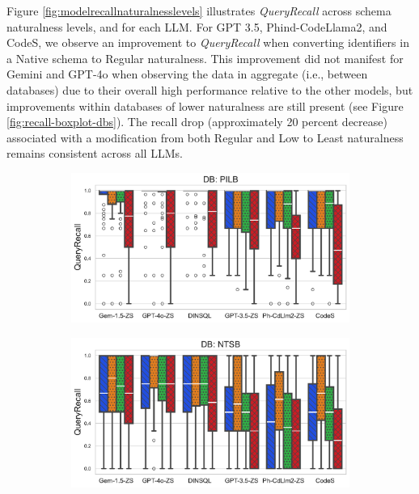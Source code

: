 Figure \ref{fig:modelrecallnaturalnesslevels} illustrates \emph{QueryRecall} across schema naturalness levels, and for each LLM.
For GPT 3.5, Phind-CodeLlama2, and CodeS, we observe an improvement to \emph{QueryRecall} when converting identifiers in a Native schema to Regular naturalness.
This improvement did not manifest for Gemini and GPT-4o when observing the data in aggregate (i.e., between databases) due to their overall high performance relative to the other models, but improvements within databases of lower naturalness are still present (see Figure \ref{fig:recall-boxplot-dbs}).
The recall drop (approximately 20 percent decrease) associated with a modification from both Regular and Low to Least naturalness remains consistent across all LLMs.

\begin{figure}
  \centering
  \begin{subfigure}{\figwidthmod\linewidth}
    \centering
    \includegraphics[width=\linewidth]{figures/natlevel-model-recall-boxplot-db-subset-PILB.pdf}
  \end{subfigure}
  \begin{subfigure}{\figwidthmod\linewidth}
    \includegraphics[width=\linewidth]{figures/natlevel-model-recall-boxplot-db-subset-NTSB.pdf}

\end{subfigure}
\end{figure}
